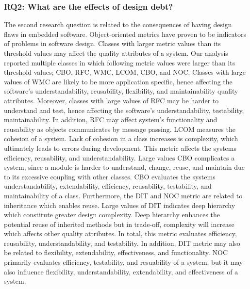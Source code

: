 \subsubsection{RQ2: What are the effects of design debt?} 
The second research question is related to the consequences of having design flaws in embedded software. Object-oriented metrics have proven to be indicators of problems in software design. Classes with larger metric values than its threshold values may affect the quality attributes of a system. Our analysis reported multiple classes in which following metric values were larger than its threshold values; CBO, RFC, WMC, LCOM, CBO, and NOC. Classes with large values of WMC are likely to be more application specific, hence affecting the software's understandability, reusability, flexibility, and maintainability quality attributes\cite{rosenberg1998applying,bansiya2002hierarchical}. Moreover, classes with large values of RFC may be harder to understand and test, hence affecting the software's understandability, testability, maintainability\cite{rosenberg1998applying}. In addition, RFC may affect system's functionality and reusability as objects communicates by message passing\cite{bansiya2002hierarchical}. LCOM measures the cohesion of a system. Lack of cohesion in a class increases is complexity, which ultimately leads to errors during development. This metric affects the systems efficiency, reusability, and understandability\cite{rosenberg1998applying,bansiya2002hierarchical}. Large values CBO complicates a system, since a module is harder to understand, change, reuse, and maintain due to its excessive coupling with other classes. CBO evaluates the systems understandability, extendability, efficiency, reusability, testability, and maintainability of a class\cite{rosenberg1998applying,bansiya2002hierarchical}. Furthermore, the DIT and NOC metric are related to inheritance which enables reuse. Large values of DIT indicates deep hierarchy which constitute greater design complexity. Deep hierarchy enhances the potential reuse of inherited methods but in trade-off, complexity will increase which affects other quality attributes. In total, this metric evaluates efficiency, reusability, understandability, and testability\cite{rosenberg1998applying}. In addition, DIT metric may also be related to flexibility, extendability, effectiveness, and functionality\cite{bansiya2002hierarchical}. NOC primarily evaluates efficiency, testability, and resuability of a system\cite{rosenberg1998applying}, but it may also influence flexibility, understandability, extendability, and effectiveness of a system\cite{bansiya2002hierarchical}.

